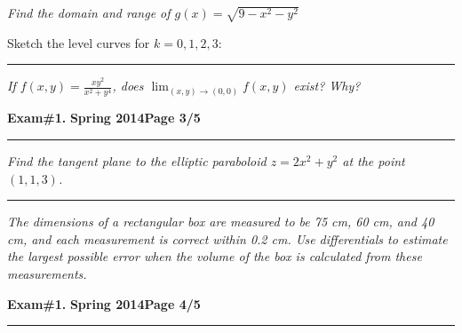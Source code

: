 \documentclass[12pt]{article}
\begin{document}
\bigskip
{\problem[15 pts] \em  Find the domain and range of
$g(x)=\sqrt{9-x^2-y^2}$}
\vspace{2.5cm}
\begin{flushright}
\end{flushright}
Sketch the level curves for $k=0,1,2,3$:
\vspace{8cm}
\hrule
{\problem[15 pts] \em If $f(x,y)=\displaystyle{\frac{xy^2}{x^2+y^4}}$, does
$\displaystyle{\lim_{(x,y)\to(0,0)} f(x,y)}$ exist?  Why?
\newpage

\hfill{\large\bf Exam\#1.}\hfill{\large\bf
  Spring 2014}\hfill{\large\bf Page 3/5}\hrule

\bigskip
{\problem[15 pts] \em Find the tangent plane to the elliptic paraboloid
$z=2x^2+y^2$ at the point $(1,1,3)$.}
\vspace{9.5cm}
\begin{flushright}
\end{flushright}
\hrule
{\problem[10 pts] \em The dimensions of a rectangular box are measured
to be 75 cm, 60 cm, and 40 cm, and each measurement is correct within
0.2 cm.  Use differentials to estimate the largest possible error when
the volume of the box is calculated from these measurements.}
\vspace{7.5cm}
\begin{flushright}
\end{flushright}
\newpage

\hfill{\large\bf Exam\#1.}\hfill{\large\bf
  Spring 2014}\hfill{\large\bf Page 4/5}\hrule

}
\end{document}
